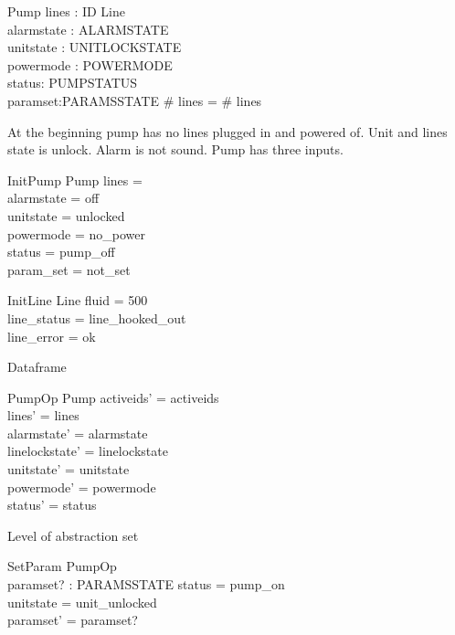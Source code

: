 \documentclass{article}
\begin{document}
	\begin{schema}{Pump}
		lines : ID \pfun Line \\
		alarmstate : ALARMSTATE \\
		unitstate : UNITLOCKSTATE \\
		powermode : POWERMODE \\
		status: PUMPSTATUS \\
		paramset:PARAMSSTATE
	\where
		\# \ran lines = \# \dom lines\\
	\end{schema}
	
	At the beginning pump has no lines plugged in and powered of.
	Unit and lines state is unlock. Alarm is not sound. 
	Pump has three inputs.	
	
	\begin{schema}{InitPump}
		Pump
		\where
		lines = \emptyset \\
		alarmstate = off \\
		unitstate  = unlocked \\
		powermode =  no\_power \\
		status = pump\_off\\
		param\_set = not\_set	
	\end{schema}
	
	\begin{schema}{InitLine}
		Line
		\where
		fluid = 500 \\
		line\_status = line\_hooked\_out \\
		line\_error = ok \\
	\end{schema}
	
	Dataframe
	\begin{schema}{PumpOp}
		\Delta Pump
	\where
    	activeids' = activeids \\
    	lines' = lines  \\
    	alarmstate' = alarmstate \\
    	linelockstate' = linelockstate  \\
    	unitstate' = unitstate \\
    	powermode' = powermode \\
    	status' = status \\
    \end{schema}
	
	Level of abstraction set 
	\begin{schema}{SetParam}
		PumpOp \\
		paramset? : PARAMSSTATE 
	\where
		status = pump\_on \\ 
		unitstate = unit\_unlocked \\
		paramset' = paramset?
	\end{schema}
	
\end{document}
